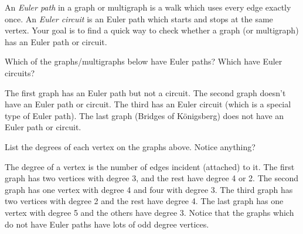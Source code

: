\documentclass[11pt]{exam}
\newcommand{\vtx}[2]{node[fill,circle,inner sep=0pt, minimum size=7pt,label=#1:#2]{}}
\renewcommand{\v}{\vtx{above}{}}
\begin{document}

\noindent An \emph{Euler path} in a graph or multigraph is a walk which uses every edge exactly once.  An \emph{Euler circuit} is an Euler path which starts and stops at the same vertex.  Your goal is to find a quick way to check whether a graph (or multigraph) has an Euler path or circuit.

\begin{questions}
\question Which of the graphs/multigraphs below have Euler paths?  Which have Euler circuits?


\begin{center}
\hfill
\hfill
\hfill
{}

\end{center}

\begin{solution}
The first graph has an Euler path but not a circuit.  The second graph doesn't have an Euler path or circuit. The third has an Euler circuit (which is a special type of Euler path).  The last graph (Bridges of K\"onigsberg) does not have an Euler path or circuit.
\end{solution}


\vfill
\question List the degrees of each vertex on the graphs above.  Notice anything?

\begin{solution}
The degree of a vertex is the number of edges incident (attached) to it.  The first graph has two vertices with degree 3, and the rest have degree 4 or 2.  The second graph has one vertex with degree 4 and four with degree 3.  The third graph has two vertices with degree 2 and the rest have degree 4.  The last graph has one vertex with degree 5 and the others have degree 3.  Notice that the graphs which do not have Euler paths have lots of odd degree vertices.
\end{solution}



\end{questions}
\end{document}
